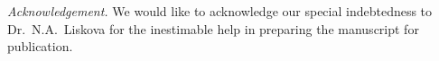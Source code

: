 {{%
\vskip 0.3cm
{\it Acknowledgement.} We would like to acknowledge our special 
indebtedness to Dr.~N.A.~Liskova for the inestimable help in 
preparing the manuscript for publication. 

\newpage
}}
